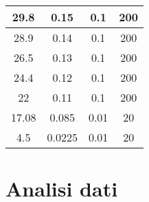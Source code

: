 \documentclass{article}
\begin{document}
\begin{table}[H]
\begin{tabular}{|c|c|c|c|}
        29.8       & 0.15              & 0.1              & 200              \\ \hline
        28.9       & 0.14              & 0.1              & 200              \\ \hline
        26.5       & 0.13              & 0.1              & 200              \\ \hline
        24.4       & 0.12              & 0.1              & 200              \\ \hline
        22         & 0.11              & 0.1              & 200              \\ \hline
        17.08      & 0.085             & 0.01             & 20               \\ \hline
        4.5        & 0.0225            & 0.01             & 20               \\ \hline
    \end{tabular}
\end{table}


\section{Analisi dati}
\end{document}
